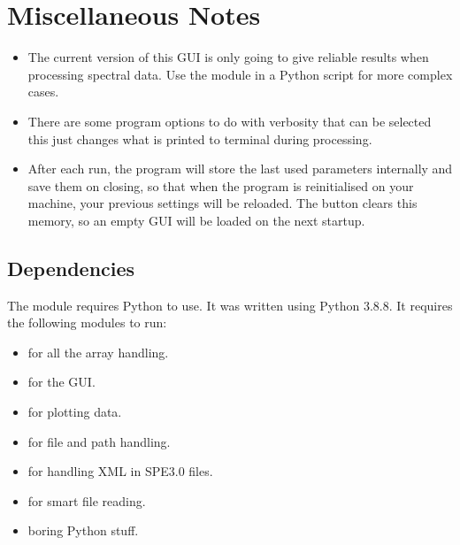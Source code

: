 \documentclass[a4paper,10pt,english]{sphinxmanual}
\begin{document}
\section{Miscellaneous Notes}
\label{\detokenize{index:miscellaneous-notes}}\begin{itemize}
\item {} 
\sphinxAtStartPar
The current version of this GUI is only going to give reliable results when processing  spectral data. Use the module in a Python script for more complex cases.

\item {} 
\sphinxAtStartPar
There are some program options to do with verbosity that can be selected \sphinxhyphen{} this just changes what is printed to terminal during processing.

\item {} 
\sphinxAtStartPar
After each run, the program will store the last used parameters internally and save them on closing, so that when the program is reinitialised on your machine, your previous settings will be reloaded. The  button clears this memory, so an empty GUI will be loaded on the next startup.

\end{itemize}


\subsection{Dependencies}
\label{\detokenize{index:dependencies}}
\sphinxAtStartPar
The  module requires Python to use. It was written using Python 3.8.8. It requires the following modules to run:
\begin{itemize}
\item {} 
\sphinxAtStartPar
{} \sphinxhyphen{} for all the array handling.

\item {} 
\sphinxAtStartPar
{} \sphinxhyphen{} for the GUI.

\item {} 
\sphinxAtStartPar
{} \sphinxhyphen{} for plotting data.

\item {} 
\sphinxAtStartPar
{} \sphinxhyphen{} for file and path handling.

\item {} 
\sphinxAtStartPar
{} \sphinxhyphen{} for handling XML in SPE3.0 files.

\item {} 
\sphinxAtStartPar
{} \sphinxhyphen{} for smart file reading.

\item {} 
\sphinxAtStartPar
{} \sphinxhyphen{} boring Python stuff.

\end{itemize}
\end{document}
